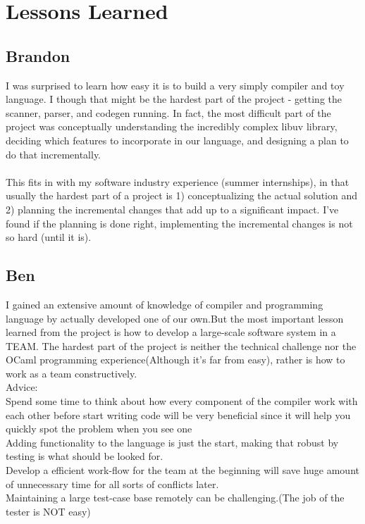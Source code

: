 \documentclass[./Report_main.tex]{subfiles}
\begin{document}


\chapter{Lessons Learned}
\section{Brandon}
I was surprised to learn how easy it is to build a very simply compiler and toy language. I though that might be the hardest part of the project - getting the scanner, parser, and codegen running. In fact, the most difficult part of the project was conceptually understanding the incredibly complex libuv library, deciding which features to incorporate in our language, and designing a plan to do that incrementally.\\\\
This fits in with my software industry experience (summer internships), in that usually the hardest part of a project is 1) conceptualizing the actual solution and 2) planning the incremental changes that add up to a significant impact. I've found if the planning is done right, implementing the incremental changes is not so hard (until it is).
\section{Ben}
I gained an extensive amount of knowledge of compiler and programming language by actually developed one of our own.But the most important lesson learned from the project is how to develop a large-scale software system in a TEAM. The hardest part of the project is neither the technical challenge nor the OCaml programming experience(Although it’s far from easy), rather is how to work as a team constructively.\\
Advice:\\
Spend some time to think about how every component of the compiler work with each other before start writing code will be very beneficial since it will help you quickly spot the problem when you see one \\ 
Adding functionality to the language is just the start, making that robust by testing is what should be looked for.\\
Develop a efficient work-flow for the team at the beginning will save huge amount of unnecessary time for all sorts of conflicts later.\\
Maintaining a large test-case base remotely can be challenging.(The job of the tester is NOT easy)\\ 
\end{document}
